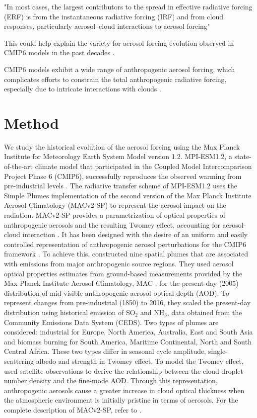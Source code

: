 \documentclass[draft]{agujournal2019}
\begin{document}
      "In most cases, the largest contributors to the spread in effective radiative forcing (ERF) is from the instantaneous radiative forcing (IRF) and from cloud responses, particularly aerosol–cloud interactions to aerosol forcing"

      This could help explain the variety for aerosol forcing evolution observed in CMIP6 models in the past decades \cite{Fiedler_2023}.
      
      CMIP6 models exhibit a wide range of anthropogenic aerosol forcing, which complicates efforts to constrain the total anthropogenic radiative forcing, especially due to intricate interactions with clouds \cite{Bellouin_2020}.
                  

\section{Method}\label{sec:method}
      We study the historical evolution of the aerosol forcing using the Max Planck Institute for Meteorology Earth System Model version 1.2. MPI-ESM1.2, a state-of-the-art climate model \cite{Mauritsen_2019} that participated in the Coupled Model Intercomparison Project Phase 6 (CMIP6), successfully reproduces the observed warming from pre-industrial levels \cite{Mauritsen_2020}.
      The radiative transfer scheme of MPI-ESM1.2 uses the Simple Plumes implementation of the second version of the Max Planck Institute Aerosol Climatology (MACv2-SP) to represent the aerosol impact on the radiation. MACv2-SP provides a parametrization of optical properties of anthropogenic aerosols and the resulting Twomey effect, accounting for aerosol-cloud interaction \cite{Stevens_2017}. It has been designed with the desire of an uniform and easily controlled representation of anthropogenic aerosol perturbations for the CMIP6 framework \cite{Eyring_2016,Pincus_2016}. To achieve this,  constructed nine spatial plumes that are associated with emissions from major anthropogenic source regions. They used aerosol optical properties estimates from ground-based measurements provided by the Max Planck Institute Aerosol Climatology, MAC \cite{Kinne_2013}, for the present-day (2005) distribution of mid-visible anthropogenic aerosol optical depth (AOD). 
      To represent changes from pre-industrial (1850) to 2016, they scaled the present-day distribution using historical emission of SO$_2$ and NH$_3$, data obtained from the Community Emissions Data System (CEDS). Two types of plumes are considered: industrial for Europe, North America, Australia, East and South Asia and biomass burning for South America, Maritime Continental, North and South Central Africa. These two types differ in seasonal cycle amplitude, single-scattering albedo and strength in Twomey effect. 
      To model the Twomey effect,  used satellite observations to derive the relationship between the cloud droplet number density and the fine-mode AOD. Through this representation, anthropogenic aerosols cause a greater increase in cloud optical thickness when the atmospheric environment is initially pristine in terms of aerosols. For the complete description of MACv2-SP, refer to .
\end{document}
